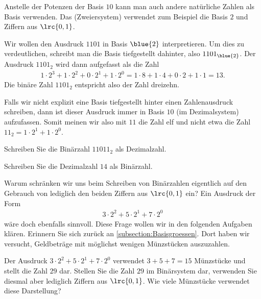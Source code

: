 Anstelle der Potenzen der Basis $10$ kann man auch andere natürliche Zahlen als Basis verwenden. 
Das  (Zweiersystem) verwendet zum Beispiel die Basis $2$ und
Ziffern aus $\lrc{0,1}$. 
\begin{myexample}
  Wir wollen den Ausdruck $1101$ in Basis $\blue{2}$ interpretieren. Um dies zu verdeutlichen, schreibt man die Basis
  tiefgestellt dahinter, also $1101_{\blue{2}}$. Der Ausdruck $1101_2$ wird dann aufgefasst als die Zahl
  \begin{align*}
    1\cdot 2^3 + 1\cdot 2^2 + 0\cdot 2^1 + 1\cdot 2^0 = 1\cdot 8 + 1\cdot 4 + 0\cdot 2 + 1\cdot 1 = 13.
  \end{align*}
  Die binäre Zahl $1101_2$ entspricht also der Zahl dreizehn.
\end{myexample}

\begin{mycaution}
  Falls wir nicht explizit eine Basis tiefgestellt hinter einen Zahlenausdruck schreiben, dann ist dieser Ausdruck immer in Basis $10$ (im
  Dezimalsystem) aufzufassen. Somit meinen wir also mit $11$ die Zahl elf und nicht etwa die Zahl $11_2 = 1\cdot 2^1 +
  1\cdot 2^0$.
\end{mycaution}

\begin{myexercise}
  Schreiben Sie die Binärzahl $11011_2$ als Dezimalzahl.
\end{myexercise}

\begin{myexercise}
  Schreiben Sie die Dezimalzahl $14$ als Binärzahl.
\end{myexercise}

Warum schränken wir uns beim Schreiben von Binärzahlen eigentlich auf den Gebrauch von lediglich den beiden Ziffern aus
$\lrc{0,1}$ ein? Ein Ausdruck der Form
\begin{align*}
  3\cdot 2^2 + 5\cdot 2^1 + 7\cdot 2^0
\end{align*}
wäre doch ebenfalls sinnvoll. Diese Frage wollen wir in den folgenden Aufgaben klären. Erinnern Sie sich zurück an \cref{subsection:Basisgroessen}. 
Dort haben wir versucht, Geldbeträge mit möglichst wenigen Münzstücken auszuzahlen. 

\begin{myexercise}
  Der Ausdruck $3\cdot 2^2 + 5\cdot 2^1 + 7\cdot 2^0$ verwendet $3+5+7 = 15$ Münzstücke und stellt die Zahl $29$ dar.
  Stellen Sie die Zahl $29$ im Binärsystem dar, verwenden Sie diesmal aber lediglich Ziffern aus $\lrc{0,1}$. Wie viele
  Münzstücke verwendet diese Darstellung?
\end{myexercise}

